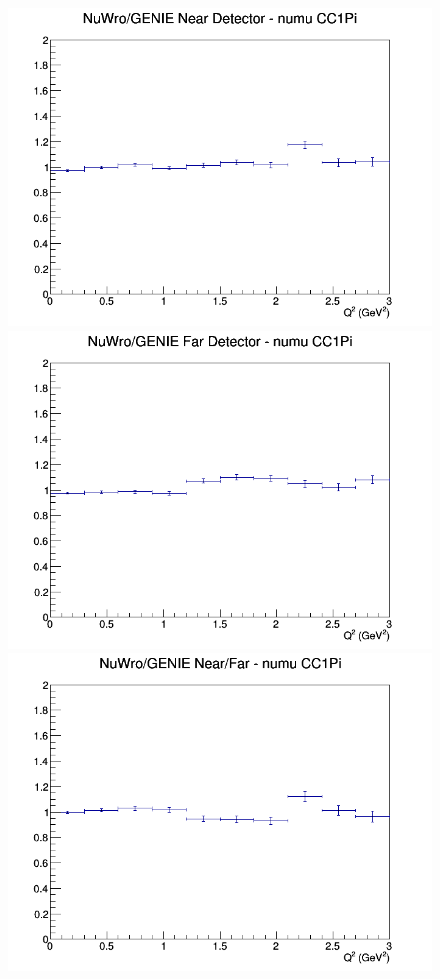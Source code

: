 \documentclass[12pt]{article}
\begin{document}
\begin{figure}[h]
\endminipage
\newline
{}
\includegraphics[width=\linewidth]{eff_Q2/LAr/ratios/CC1Pi_NuWro_GENIE_numu_near_Q2.png}
\endminipage
{}
\includegraphics[width=\linewidth]{eff_Q2/LAr/ratios/CC1Pi_NuWro_GENIE_numu_far_Q2.png}
\endminipage
{}
\includegraphics[width=\linewidth]{eff_Q2/LAr/ratios/CC1Pi_NuWro_GENIE_numu_NF_Q2.png}
\endminipage
\newline
\end{figure}
\clearpage
\end{document}
